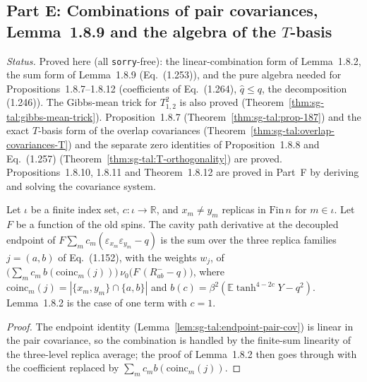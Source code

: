 \subsection{Part E: Combinations of pair covariances, Lemma~1.8.9 and the algebra of the $T$-basis}

\emph{Status.}  Proved here (all \texttt{sorry}-free): the linear-combination form of
Lemma~1.8.2, the sum form of Lemma~1.8.9 (Eq.~(1.253)), and the pure algebra needed for
Propositions~1.8.7--1.8.12 (coefficients of Eq.~(1.264), $\hat q\le q$, the decomposition (1.246)).
The Gibbs-mean trick for $T_{1,2}^2$ is also proved (Theorem~\ref{thm:sg-tal:gibbs-mean-trick}).
Proposition~1.8.7 (Theorem~\ref{thm:sg-tal:prop-187}) and the exact $T$-basis form of the overlap covariances (Theorem~\ref{thm:sg-tal:overlap-covariances-T}) and the separate zero identities of Proposition~1.8.8 and Eq.~(1.257) (Theorem~\ref{thm:sg-tal:T-orthogonality}) are proved.
Propositions~1.8.10, 1.8.11 and Theorem~1.8.12 are proved in Part~F by deriving and solving the covariance system.

\begin{theorem}
\label{thm:sg-tal:lemma-182-combo}
  \leanok
{}
Let $\iota$ be a finite index set, $c:\iota\to\mathbb R$, and $x_m\ne y_m$ replicas in
$\mathrm{Fin}\,n$ for $m\in\iota$.  Let $F$ be a function of the old spins.  The cavity path
derivative at the decoupled endpoint of
$F\sum_m c_m(\varepsilon_{x_m}\varepsilon_{y_m}-q)$ is the sum over the three replica families $j=(a,b)$
of Eq.~(1.152), with the weights $w_j$, of
$\bigl(\sum_m c_m\, b(\mathrm{coinc}_m(j))\bigr)\,\nu_0\bigl(F\,(R^-_{ab}-q)\bigr)$, where
$\mathrm{coinc}_m(j)=|\{x_m,y_m\}\cap\{a,b\}|$ and $b(c)=\beta^2(\mathbb E\tanh^{4-2c}Y-q^2)$.
Lemma~1.8.2 is the case of one term with $c=1$.
\end{theorem}
\begin{proof}
  \leanok
The endpoint identity (Lemma~\ref{lem:sg-tal:endpoint-pair-cov}) is linear in the pair
covariance, so the combination is handled by the finite-sum linearity of the three-level replica
average; the proof of Lemma~1.8.2 then goes through with the coefficient replaced by
$\sum_m c_m b(\mathrm{coinc}_m(j))$.
\end{proof}

